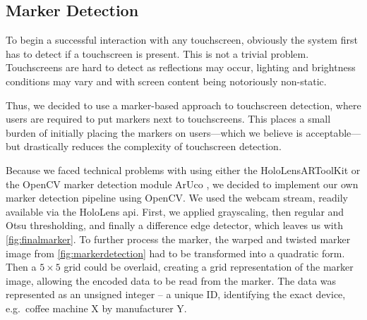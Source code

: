 \subsection{Marker Detection}
\label{subsec:markers}
To begin a successful interaction with any touchscreen, obviously the system first has to detect if a touchscreen is present.
This is not a trivial problem.
Touchscreens are hard to detect as reflections may occur, lighting and brightness conditions may vary and with screen content being notoriously non-static.


Thus, we decided to use a marker-based approach to touchscreen detection, where users are required to put markers next to touchscreens.
This places a small burden of initially placing the markers on users---which we believe is acceptable---but drastically reduces the complexity of touchscreen detection.

Because we faced technical problems with using either the HoloLensARToolKit \cite{artoolkit}  or the OpenCV marker detection module ArUco \cite{aruco}, we decided to implement our own marker detection pipeline using OpenCV.
We used the webcam stream, readily available via the HoloLens \ac{api}.
First, we applied grayscaling, then regular and Otsu thresholding, and finally a difference edge detector, which leaves us with \autoref{fig:finalmarker}.
To further process the marker, the warped and twisted marker image from \autoref{fig:markerdetection} had to be transformed into a quadratic form.
Then a $5\times5$ grid could be overlaid, creating a grid representation of the marker image, allowing the encoded data to be read from the marker.
The data was represented as an unsigned integer -- a unique ID, identifying the exact device, e.g.\ coffee machine X by manufacturer Y.

